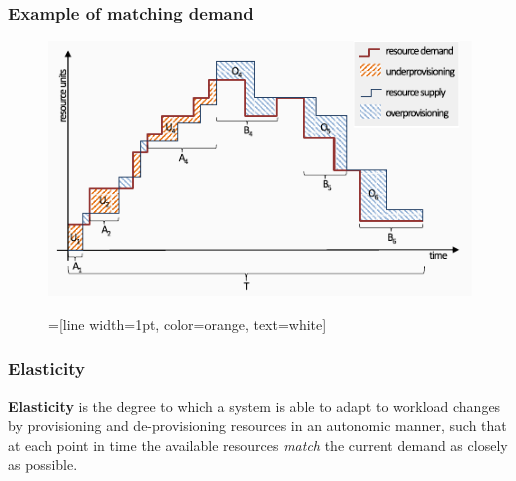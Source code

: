 \documentclass{beamer}
\begin{document}
\begin{frame}
  \frametitle{Example of matching demand~\cite{herbst2013elasticity}}
  \begin{figure}
    \includegraphics[clip, width=\textwidth]{images/workload}
  \end{figure}
\end{frame}

\begin{frame}
\begin{figure}
=[line width=1pt, color=orange, text=white]
\def\firstcircle{(-2.85,0) circle (1.5cm)}
\def\secondcircle{(0,2.85) circle (1.5cm)}
\def\thirdcircle{(2.85,0) circle (1.5cm)}
\def\bigcircle{(0,1) ellipse (5.5cm and 3.5cm)}
\end{figure}
\end{frame}

\begin{frame}
  \frametitle{Elasticity~\cite{herbst2013elasticity}}
  \begin{definition}
  \parbox{\linewidth}{\textbf{Elasticity} is the degree to which a system is able to adapt to workload changes by provisioning and de-provisioning resources in an autonomic manner, such that at each point in time the available resources \textit{match} the current demand as closely as possible.}
  \end{definition}
\end{frame}
\end{document}
